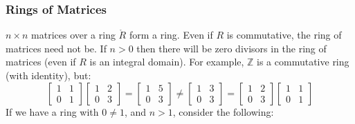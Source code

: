 \documentclass{article}                                                        %
\begin{document}
            \subsubsection{Rings of Matrices}
                $n\times{n}$ matrices over a ring $\ring{R}$ form a ring. Even
                if $R$ is commutative, the ring of matrices need not be. If
                $n>0$ then there will be zero divisors in the ring of matrices
                (even if $R$ is an integral domain). For example,
                $\mathbb{Z}$ is a commutative ring (with identity), but:
                \begin{equation}
                    \begin{bmatrix}
                        1&1\\
                        0&1
                    \end{bmatrix}
                    \begin{bmatrix}
                        1&2\\
                        0&3
                    \end{bmatrix}
                    =
                    \begin{bmatrix}
                        1&5\\
                        0&3
                    \end{bmatrix}
                    \ne
                    \begin{bmatrix}
                        1&3\\
                        0&3
                    \end{bmatrix}
                    =
                    \begin{bmatrix}
                        1&2\\
                        0&3
                    \end{bmatrix}
                    \begin{bmatrix}
                        1&1\\
                        0&1
                    \end{bmatrix}
                \end{equation}
                If we have a ring with $0\ne{1}$, and $n>1$, consider the
                following:
\end{document}
